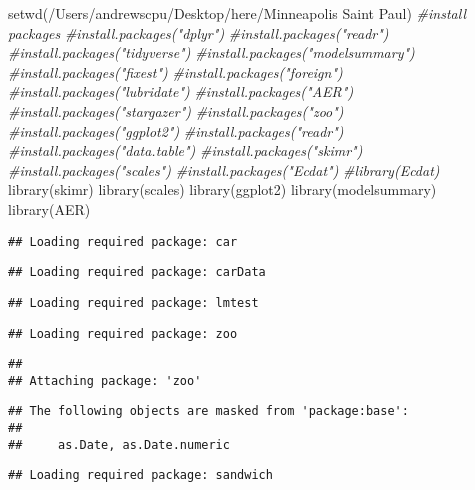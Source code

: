 \documentclass[
]{article}
\newenvironment{Shaded}{\begin{snugshade}}{\end{snugshade}}
\newcommand{\CommentTok}[1]{\textcolor[rgb]{0.56,0.35,0.01}{\textit{#1}}}
\newcommand{\FunctionTok}[1]{\textcolor[rgb]{0.00,0.00,0.00}{#1}}
\newcommand{\NormalTok}[1]{#1}
\newcommand{\StringTok}[1]{\textcolor[rgb]{0.31,0.60,0.02}{#1}}
\begin{document}
\begin{Shaded}
\begin{Highlighting}[]
\FunctionTok{setwd}\NormalTok{(}\StringTok{\textquotesingle{}/Users/andrewscpu/Desktop/here/Minneapolis Saint Paul\textquotesingle{}}\NormalTok{)}
\CommentTok{\#install packages}
\CommentTok{\#install.packages("dplyr")}
\CommentTok{\#install.packages("readr")}
\CommentTok{\#install.packages("tidyverse")}
\CommentTok{\#install.packages("modelsummary")}
\CommentTok{\#install.packages("fixest")}
\CommentTok{\#install.packages("foreign")}
\CommentTok{\#install.packages("lubridate")}
\CommentTok{\#install.packages("AER")}
\CommentTok{\#install.packages("stargazer")}
\CommentTok{\#install.packages("zoo")}
\CommentTok{\#install.packages("ggplot2")}
\CommentTok{\#install.packages("readr")}
\CommentTok{\#install.packages("data.table")}
\CommentTok{\#install.packages("skimr")}
\CommentTok{\#install.packages("scales")}
\CommentTok{\#install.packages("Ecdat")}
\CommentTok{\#library(Ecdat)}
\FunctionTok{library}\NormalTok{(skimr)}
\FunctionTok{library}\NormalTok{(scales)}
\FunctionTok{library}\NormalTok{(ggplot2)}
\FunctionTok{library}\NormalTok{(modelsummary)}
\FunctionTok{library}\NormalTok{(AER)}
\end{Highlighting}
\end{Shaded}

\begin{verbatim}
## Loading required package: car
\end{verbatim}

\begin{verbatim}
## Loading required package: carData
\end{verbatim}

\begin{verbatim}
## Loading required package: lmtest
\end{verbatim}

\begin{verbatim}
## Loading required package: zoo
\end{verbatim}

\begin{verbatim}
## 
## Attaching package: 'zoo'
\end{verbatim}

\begin{verbatim}
## The following objects are masked from 'package:base':
## 
##     as.Date, as.Date.numeric
\end{verbatim}

\begin{verbatim}
## Loading required package: sandwich
\end{verbatim}
\end{document}
